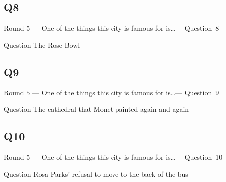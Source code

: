 \documentclass[11pt]{beamer}
\begin{document}
\subsection*{Q8}
\begin{frame}[t]{Round 5 --- One of the things this city is famous for is\ldots --- \mbox{Question 8}}
    \vspace{-0.5em}
    \begin{block}{Question}
        The Rose Bowl
    \end{block}
\end{frame}
\subsection*{Q9}
\begin{frame}[t]{Round 5 --- One of the things this city is famous for is\ldots --- \mbox{Question 9}}
    \vspace{-0.5em}
    \begin{block}{Question}
        The cathedral that Monet painted again and again
    \end{block}
\end{frame}
\subsection*{Q10}
\begin{frame}[t]{Round 5 --- One of the things this city is famous for is\ldots --- \mbox{Question 10}}
    \vspace{-0.5em}
    \begin{block}{Question}
        Rosa Parks' refusal to move to the back of the bus
    \end{block}
\end{frame}
\end{document}
